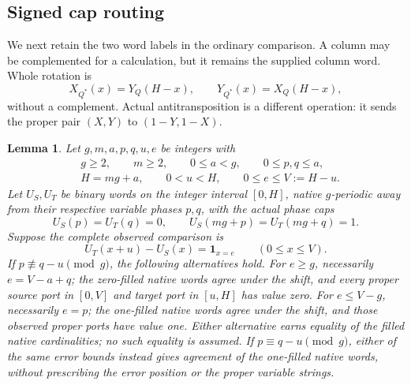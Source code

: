 \documentclass[11pt,a4paper]{amsart}
\numberwithin{equation}{section}
\theoremstyle{plain}
\newtheorem{lemma}[theorem]{Lemma}
\theoremstyle{definition}
\newcommand{\one}{\mathbf1}
\begin{document}
\subsection{Signed cap routing}

We next retain the two word labels in the ordinary comparison.  A column
may be complemented for a calculation, but it remains the supplied
column word.  Whole rotation is
\begin{equation}\label{ge:eq:rotation}
 X_{Q^*}(x)=Y_Q(H-x),\qquad Y_{Q^*}(x)=X_Q(H-x),
\end{equation}
without a complement.  Actual antitransposition is a different operation:
it sends the proper pair \((X,Y)\) to \((1-Y,1-X)\).

\begin{lemma}\label{ge:signed-cap}
Let \(g,m,a,p,q,u,e\) be integers with
\[
 \begin{aligned}
 &g\ge2,\qquad m\ge2,\qquad 0\le a<g,\qquad 0\le p,q\le a,\\
 &H=mg+a,\qquad 0<u<H,\qquad 0\le e\le V:=H-u.
 \end{aligned}
\]
Let \(U_S,U_T\) be binary words on the integer interval \([0,H]\),
native \(g\)-periodic away from their respective variable phases
\(p,q\), with the actual phase caps
\[
 U_S(p)=U_T(q)=0,\qquad U_S(mg+p)=U_T(mg+q)=1.
\]
Suppose the complete observed comparison is
\[
 U_T(x+u)-U_S(x)=\one_{x=e}\qquad(0\le x\le V).
\]
If \(p\not\equiv q-u\pmod g\), the following alternatives hold.
For \(e\ge g\), necessarily \(e=V-a+q\); the zero-filled native
words agree under the shift, and every proper source port in \([0,V]\)
and target port in \([u,H]\) has value zero.
For \(e\le V-g\), necessarily \(e=p\); the one-filled native words
agree under the shift, and those observed proper ports have value one.
Either alternative earns equality of the filled native cardinalities;
no such equality is assumed.
If \(p\equiv q-u\pmod g\), either of the same error bounds instead
gives agreement of the one-filled native words, without prescribing
the error position or the proper variable strings.
\end{lemma}
\end{document}
